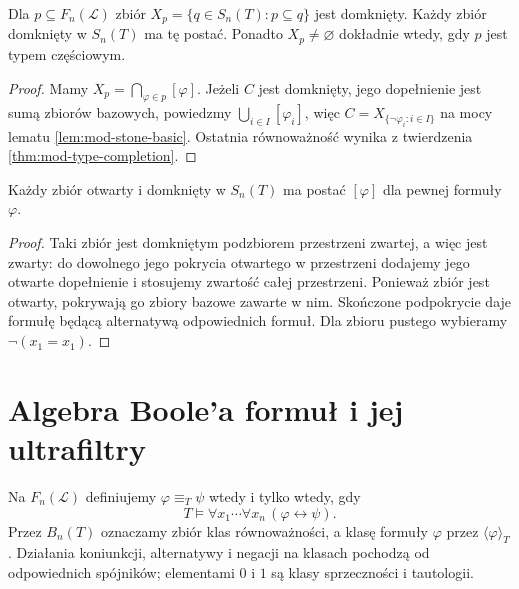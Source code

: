 \begin{wniosek}
\label{cor:mod-stone-closed-types}
Dla $p\subseteq F_n(\mathcal L)$ zbiór
$X_p=\{q\in S_n(T):p\subseteq q\}$ jest domknięty.
Każdy zbiór domknięty w $S_n(T)$ ma tę postać.
Ponadto $X_p\ne\varnothing$ dokładnie wtedy, gdy $p$
jest typem częściowym.
\end{wniosek}
\begin{proof}
Mamy $X_p=\bigcap_{\varphi\in p}[\varphi]$. Jeżeli $C$
jest domknięty, jego dopełnienie jest sumą zbiorów bazowych,
powiedzmy $\bigcup_{i\in I}[\varphi_i]$, więc
$C=X_{\{\neg\varphi_i:i\in I\}}$ na mocy
lematu \ref{lem:mod-stone-basic}. Ostatnia równoważność
wynika z twierdzenia \ref{thm:mod-type-completion}.
\end{proof}

\begin{wniosek}
\label{cor:mod-stone-clopens}
Każdy zbiór otwarty i domknięty w $S_n(T)$ ma postać
$[\varphi]$ dla pewnej formuły $\varphi$.
\end{wniosek}
\begin{proof}
Taki zbiór jest domkniętym podzbiorem przestrzeni zwartej,
a więc jest zwarty: do dowolnego jego pokrycia otwartego
w przestrzeni dodajemy jego otwarte dopełnienie i stosujemy
zwartość całej przestrzeni. Ponieważ zbiór jest otwarty,
pokrywają go zbiory bazowe zawarte w nim. Skończone
podpokrycie daje formułę będącą alternatywą odpowiednich
formuł. Dla zbioru pustego wybieramy $\neg(x_1=x_1)$.
\end{proof}

\section{Algebra Boole'a formuł i jej ultrafiltry}
\begin{definicja}
\label{def:mod-lindenbaum-algebra}
Na $F_n(\mathcal L)$ definiujemy
$\varphi\equiv_T\psi$ wtedy i tylko wtedy, gdy
\[
T\models\forall x_1\cdots\forall x_n\,(\varphi\leftrightarrow\psi).
\]
Przez $B_n(T)$ oznaczamy zbiór klas równoważności, a klasę
formuły $\varphi$ przez $\langle\varphi\rangle_T$.
Działania koniunkcji, alternatywy i negacji na klasach
pochodzą od odpowiednich spójników; elementami $0$ i $1$
są klasy sprzeczności i tautologii.
\end{definicja}

